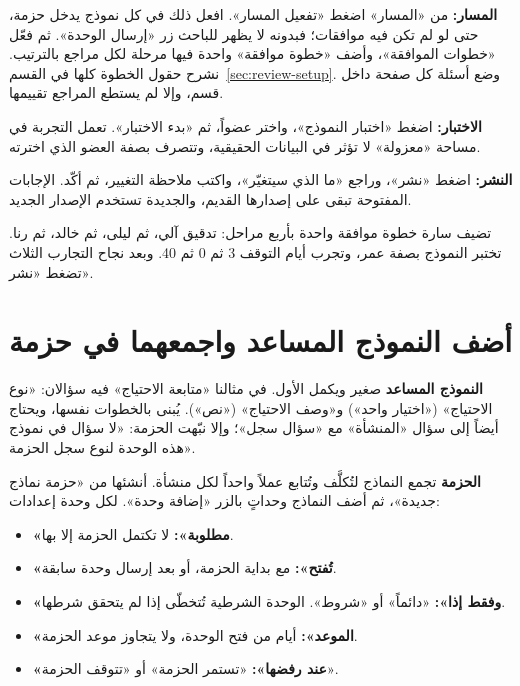 \textbf{المسار:} من «المسار» اضغط «تفعيل المسار». افعل ذلك في كل نموذج يدخل حزمة، حتى لو لم تكن فيه موافقات؛ فبدونه لا يظهر للباحث زر «إرسال الوحدة». ثم فعّل «خطوات الموافقة»، وأضف «خطوة موافقة» واحدة فيها مرحلة لكل مراجع بالترتيب. نشرح حقول الخطوة كلها في القسم~\ref{sec:review-setup}. وضع أسئلة كل صفحة داخل قسم، وإلا لم يستطع المراجع تقييمها.

\textbf{الاختبار:} اضغط «اختبار النموذج»، واختر عضواً، ثم «بدء الاختبار». تعمل التجربة في مساحة «معزولة» لا تؤثر في البيانات الحقيقية، وتتصرف بصفة العضو الذي اخترته.

\textbf{النشر:} اضغط «نشر»، وراجع «ما الذي سيتغيّر»، واكتب ملاحظة التغيير، ثم أكّد. الإجابات المفتوحة تبقى على إصدارها القديم، والجديدة تستخدم الإصدار الجديد.

\begin{rcnote}
تضيف سارة خطوة موافقة واحدة بأربع مراحل: تدقيق آلي، ثم ليلى، ثم خالد، ثم رنا. تختبر النموذج بصفة عمر، وتجرب أيام التوقف 3 ثم 0 ثم 40. وبعد نجاح التجارب الثلاث تضغط «نشر».
\end{rcnote}

\section{أضف النموذج المساعد واجمعهما في حزمة}
\label{sec:forms-package}

\textbf{النموذج المساعد} صغير ويكمل الأول. في مثالنا «متابعة الاحتياج» فيه سؤالان: «نوع الاحتياج» («اختيار واحد») و«وصف الاحتياج» («نص»). يُبنى بالخطوات نفسها، ويحتاج أيضاً إلى سؤال «المنشأة» مع «سؤال سجل»؛ وإلا نبّهت الحزمة: «لا سؤال في نموذج هذه الوحدة لنوع سجل الحزمة».

\textbf{الحزمة} تجمع النماذج لتُكلَّف وتُتابع عملاً واحداً لكل منشأة. أنشئها من «حزمة نماذج جديدة»، ثم أضف النماذج وحداتٍ بالزر «إضافة وحدة». لكل وحدة إعدادات:

\begin{itemize}
\item \textbf{«مطلوبة»:} لا تكتمل الحزمة إلا بها.
\item \textbf{«تُفتح»:} مع بداية الحزمة، أو بعد إرسال وحدة سابقة.
\item \textbf{«وفقط إذا»:} «دائماً» أو «شروط». الوحدة الشرطية تُتخطّى إذا لم يتحقق شرطها.
\item \textbf{«الموعد»:} أيام من فتح الوحدة، ولا يتجاوز موعد الحزمة.
\item \textbf{«عند رفضها»:} «تستمر الحزمة» أو «تتوقف الحزمة».
\end{itemize}

